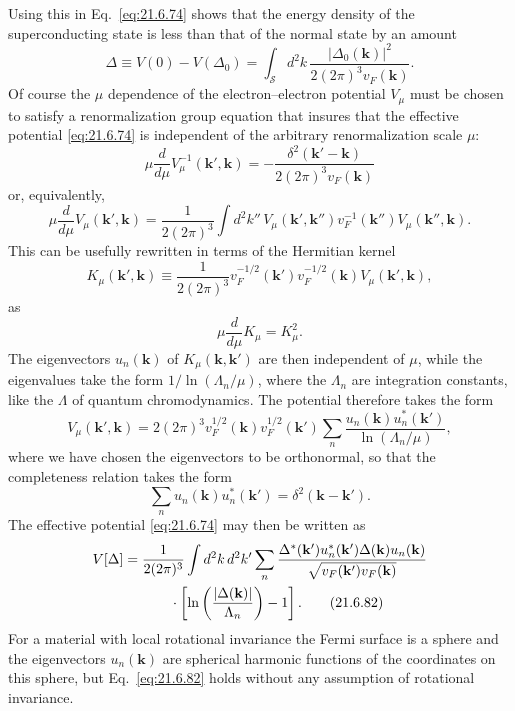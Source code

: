 Using this in Eq.~\eqref{eq:21.6.74} shows that the energy density of the superconducting state is less than that of the normal state by an amount
\begin{equation}
\Delta\equiv V(0)-V(\Delta_0)
=\int_{\mathcal S}d^2k\,
\frac{|\Delta_0(\mathbf k)|^2}{2(2\pi)^3v_F(\mathbf k)}.
\tag{21.6.76}\label{eq:21.6.76}
\end{equation}
Of course the $\mu$ dependence of the electron--electron potential $V_\mu$ must be chosen to satisfy a renormalization group equation that insures that the effective potential \eqref{eq:21.6.74} is independent of the arbitrary renormalization scale $\mu$:
\[
\mu\frac{d}{d\mu}V_\mu^{-1}(\mathbf k',\mathbf k)
=-\frac{\delta^2(\mathbf k'-\mathbf k)}
{2(2\pi)^3v_F(\mathbf k)}
\]
or, equivalently,
\begin{equation}
\mu\frac{d}{d\mu}V_\mu(\mathbf k',\mathbf k)
=\frac{1}{2(2\pi)^3}
\int d^2k''\,
V_\mu(\mathbf k',\mathbf k'')
v_F^{-1}(\mathbf k'')
V_\mu(\mathbf k'',\mathbf k).
\tag{21.6.77}\label{eq:21.6.77}
\end{equation}
This can be usefully rewritten in terms of the Hermitian kernel
\begin{equation}
K_\mu(\mathbf k',\mathbf k)
\equiv\frac{1}{2(2\pi)^3}
v_F^{-1/2}(\mathbf k')v_F^{-1/2}(\mathbf k)
V_\mu(\mathbf k',\mathbf k),
\tag{21.6.78}\label{eq:21.6.78}
\end{equation}
as
\begin{equation}
\mu\frac{d}{d\mu}K_\mu=K_\mu^2.
\tag{21.6.79}\label{eq:21.6.79}
\end{equation}
The eigenvectors $u_n(\mathbf k)$ of $K_\mu(\mathbf k,\mathbf k')$ are then independent of $\mu$, while the eigenvalues take the form $1/\ln(\Lambda_n/\mu)$, where the $\Lambda_n$ are integration constants, like the $\Lambda$ of quantum chromodynamics. The potential therefore takes the form
\begin{equation}
V_\mu(\mathbf k',\mathbf k)
=2(2\pi)^3v_F^{1/2}(\mathbf k)v_F^{1/2}(\mathbf k')
\sum_n
\frac{u_n(\mathbf k)u_n^*(\mathbf k')}
{\ln(\Lambda_n/\mu)},
\tag{21.6.80}\label{eq:21.6.80}
\end{equation}
where we have chosen the eigenvectors to be orthonormal, so that the completeness relation takes the form
\begin{equation}
\sum_n u_n(\mathbf k)u_n^*(\mathbf k')
=\delta^2(\mathbf k-\mathbf k').
\tag{21.6.81}\label{eq:21.6.81}
\end{equation}
The effective potential \eqref{eq:21.6.74} may then be written as
\begin{align}
V[\Delta]
={}&\frac{1}{2(2\pi)^3}
\int d^2k\,d^2k'\sum_n
\frac{
\Delta^*(\mathbf k')u_n^*(\mathbf k')
\Delta(\mathbf k)u_n(\mathbf k)}
{\sqrt{v_F(\mathbf k')v_F(\mathbf k)}}
\notag\\
&\qquad\cdot
\left[
\ln\left(\frac{|\Delta(\mathbf k)|}{\Lambda_n}\right)-1
\right].
\tag{21.6.82}\label{eq:21.6.82}
\end{align}
For a material with local rotational invariance the Fermi surface is a sphere and the eigenvectors $u_n(\mathbf k)$ are spherical harmonic functions of the coordinates on this sphere, but Eq.~\eqref{eq:21.6.82} holds without any assumption of rotational invariance.

